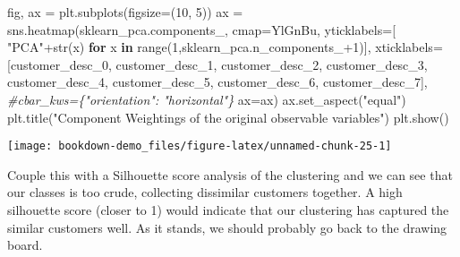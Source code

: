 \documentclass[]{tufte-book}
\newenvironment{Shaded}{}{}
\newcommand{\BuiltInTok}[1]{#1}
\newcommand{\CommentTok}[1]{\textcolor[rgb]{0.38,0.63,0.69}{\textit{#1}}}
\newcommand{\ControlFlowTok}[1]{\textcolor[rgb]{0.00,0.44,0.13}{\textbf{#1}}}
\newcommand{\DecValTok}[1]{\textcolor[rgb]{0.25,0.63,0.44}{#1}}
\newcommand{\KeywordTok}[1]{\textcolor[rgb]{0.00,0.44,0.13}{\textbf{#1}}}
\newcommand{\NormalTok}[1]{#1}
\newcommand{\OperatorTok}[1]{\textcolor[rgb]{0.40,0.40,0.40}{#1}}
\newcommand{\StringTok}[1]{\textcolor[rgb]{0.25,0.44,0.63}{#1}}
\theoremstyle{definition}
\theoremstyle{definition}
\theoremstyle{definition}
\theoremstyle{remark}
\begin{document}
\begin{Shaded}
\begin{Highlighting}[]
\NormalTok{fig, ax }\OperatorTok{=}\NormalTok{ plt.subplots(figsize}\OperatorTok{=}\NormalTok{(}\DecValTok{10}\NormalTok{, }\DecValTok{5}\NormalTok{))}
\NormalTok{ax }\OperatorTok{=}\NormalTok{ sns.heatmap(sklearn\_pca.components\_,}
\NormalTok{                 cmap}\OperatorTok{=}\StringTok{\textquotesingle{}YlGnBu\textquotesingle{}}\NormalTok{,}
\NormalTok{                 yticklabels}\OperatorTok{=}\NormalTok{[ }\StringTok{"PCA"}\OperatorTok{+}\BuiltInTok{str}\NormalTok{(x) }\ControlFlowTok{for}\NormalTok{ x }\KeywordTok{in} \BuiltInTok{range}\NormalTok{(}\DecValTok{1}\NormalTok{,sklearn\_pca.n\_components\_}\OperatorTok{+}\DecValTok{1}\NormalTok{)],}
\NormalTok{  xticklabels}\OperatorTok{=}\NormalTok{[}\StringTok{\textquotesingle{}customer\_desc\_0\textquotesingle{}}\NormalTok{, }\StringTok{\textquotesingle{}customer\_desc\_1\textquotesingle{}}\NormalTok{, }\StringTok{\textquotesingle{}customer\_desc\_2\textquotesingle{}}\NormalTok{,}
  \StringTok{\textquotesingle{}customer\_desc\_3\textquotesingle{}}\NormalTok{, }\StringTok{\textquotesingle{}customer\_desc\_4\textquotesingle{}}\NormalTok{, }\StringTok{\textquotesingle{}customer\_desc\_5\textquotesingle{}}\NormalTok{,}
  \StringTok{\textquotesingle{}customer\_desc\_6\textquotesingle{}}\NormalTok{, }\StringTok{\textquotesingle{}customer\_desc\_7\textquotesingle{}}\NormalTok{],}
  \CommentTok{\#cbar\_kws=\{"orientation": "horizontal"\}}
\NormalTok{  ax}\OperatorTok{=}\NormalTok{ax)}
\NormalTok{ax.set\_aspect(}\StringTok{"equal"}\NormalTok{)}
\NormalTok{plt.title(}\StringTok{"Component Weightings of the original observable variables"}\NormalTok{)}
\NormalTok{plt.show()}
\end{Highlighting}
\end{Shaded}

\texttt{[image: bookdown-demo\_files/figure-latex/unnamed-chunk-25-1]}

Couple this with a Silhouette score analysis of the clustering and we can see that our classes is too crude, collecting dissimilar customers together. A high silhouette score (closer to 1) would indicate that our clustering has captured the similar customers well. As it stands, we should probably go back to the drawing board.
\end{document}

